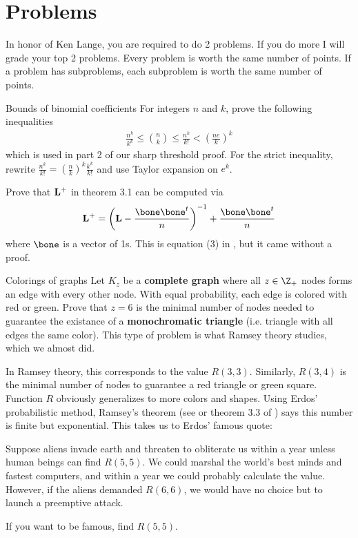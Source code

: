 \documentclass[./some_latex_template.tex]{subfiles}
\begin{document}
\section{Problems}

In honor of Ken Lange, you are required to do 2 problems. If you do more I will grade your top 2 problems. Every problem is worth the same number of points. If a problem has subproblems, each subproblem is worth the same number of points.

\begin{problembox}{Bounds of binomial coefficients}{}
For integers $n$ and $k$, prove the following inequalities
\begin{align*}
	\frac{n^k}{k^k} \le {n \choose k} \le \frac{n^k}{k!} < \left( \frac{ne}{k}\right)^k
\end{align*}
which is used in part 2 of our sharp threshold proof. For the strict inequality, rewrite $\frac{n^k}{k!} = \left(\frac{n}{k}\right)^k \frac{k^k}{k!}$ and use Taylor expansion on $e^k$.
\end{problembox}

\begin{problembox}{}{}
Prove that $\mathbf{L}^+$ in theorem 3.1 can be computed via
\begin{align*}
	\bL^+ = \left(\bL - \frac{ \bone\bone^t }{n}\right)^{-1} + \frac{\bone\bone^t}{n}
\end{align*}
where $\bone$ is a vector of 1s. This is equation (3) in \cite{fouss2007random}, but it came without a proof.
\end{problembox}

\begin{problembox}{Colorings of graphs}{}
Let $K_z$ be a \textbf{complete graph} where all $z \in \Z_+$ nodes forms an edge with every other node. With equal probability, each edge is colored with red or green. Prove that $z=6$ is the minimal number of nodes needed to guarantee the existance of a \textbf{monochromatic triangle} (i.e. triangle with all edges the same color). This type of problem is what Ramsey theory studies, which we almost did. 
\end{problembox}
In Ramsey theory, this corresponds to the value $R(3, 3)$. Similarly, $R(3, 4)$ is the minimal number of nodes to guarantee a red triangle or green square. Function $R$ obviously generalizes to more colors and shapes. Using Erdos' probabilistic method, Ramsey's theorem (see \cite{sebv} or theorem 3.3 of \cite{van2001course}) says this number is finite but exponential.  This takes us to Erdos' famous quote:

\begin{displayquote}
Suppose aliens invade earth and threaten to obliterate us within a year unless human beings can find $R(5, 5)$. We could marshal the world's best minds and fastest computers, and within a year we could probably calculate the value. However, if the aliens demanded $R(6, 6)$, we would have no choice but to launch a preemptive attack.
\end{displayquote}
If you want to be famous, find $R(5, 5)$. 


\end{document}
